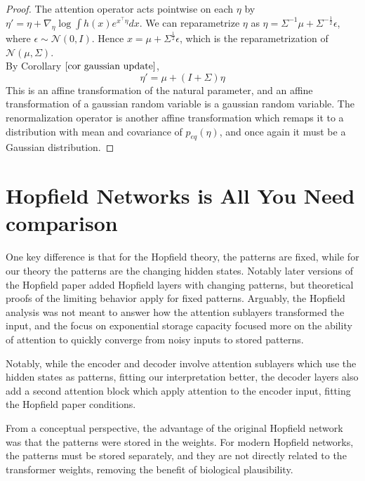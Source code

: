\documentclass{article}
\begin{document}
\begin{proof}
  The attention operator acts pointwise on each $\eta$ by $\eta' = \eta + \nabla_\eta \log \int h(x) e^{x^\intercal \eta} dx$. We can reparametrize $\eta$ as $ \eta = \Sigma^{-1} \mu + \Sigma^{ - \frac{1}{2} } \epsilon$, where $\epsilon \sim \mathcal{N}(0,I)$. Hence $x = \mu + \Sigma^{\frac{1}{2}} \epsilon$, which is the reparametrization of $\mathcal{N}(\mu,\Sigma)$. \\
  By Corollary $\autoref{cor gaussian update}$,
  \begin{equation}
    \eta' = \mu + ( I + \Sigma) \eta
    \label{gaussian attention update}
  \end{equation}
  This is an affine transformation of the natural parameter, and an affine transformation of a gaussian random variable is a gaussian random variable. The renormalization operator is another affine transformation which remaps it to a distribution with mean and covariance of $p_{eq}(\eta)$, and once again it must be a Gaussian distribution.

\end{proof}

\section{Hopfield Networks is All You Need comparison}
\label{hniayn}

One key difference is that for the Hopfield theory, the patterns are fixed, while for our theory the patterns are the changing hidden states. Notably later versions of the Hopfield paper added Hopfield layers with changing patterns, but theoretical proofs of the limiting behavior apply for fixed patterns. Arguably, the Hopfield analysis was not meant to answer how the attention sublayers transformed the input, and the focus on exponential storage capacity focused more on the ability of attention to quickly converge from noisy inputs to stored patterns.

Notably, while the encoder and decoder involve attention sublayers which use the hidden states as patterns, fitting our interpretation better, the decoder layers also add a second attention block which apply attention to the encoder input, fitting the Hopfield paper conditions.

From a conceptual perspective, the advantage of the original Hopfield network was that the patterns were stored in the weights. For modern Hopfield networks, the patterns must be stored separately, and they are not directly related to the transformer weights, removing the benefit of biological plausibility. 
\end{document}
